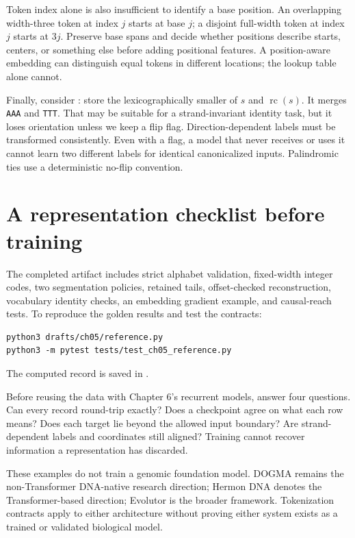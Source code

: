 Token index alone is also insufficient to identify a base position.
An overlapping width-three token at index $j$ starts at base $j$;
a disjoint full-width token at index $j$ starts at $3j$. Preserve base
spans and decide whether positions describe starts, centers, or something
else before adding positional features. A position-aware embedding can
distinguish equal tokens in different locations; the lookup table alone cannot.

Finally, consider : store the lexicographically
smaller of $s$ and $\operatorname{rc}(s)$. It merges \texttt{AAA} and
\texttt{TTT}. That may be suitable for a strand-invariant identity task,
but it loses orientation unless we keep a flip flag. Direction-dependent
labels must be transformed consistently. Even with a flag, a model that
never receives or uses it cannot learn two different labels for identical
canonicalized inputs. Palindromic ties use a deterministic no-flip convention.

\section{A representation checklist before training}

The completed artifact includes strict alphabet validation, fixed-width
integer codes, two segmentation policies, retained tails, offset-checked
reconstruction, vocabulary identity checks, an embedding gradient example,
and causal-reach tests. To reproduce the golden results and test the contracts:
\begin{Verbatim}[fontsize=\small]
python3 drafts/ch05/reference.py
python3 -m pytest tests/test_ch05_reference.py
\end{Verbatim}
The computed record is saved in .

Before reusing the data with Chapter 6's recurrent models, answer four
questions. Can every record round-trip exactly? Does a checkpoint agree
on what each row means? Does each target lie beyond the allowed input
boundary? Are strand-dependent labels and coordinates still aligned?
Training cannot recover information a representation has discarded.

These examples do not train a genomic foundation model. DOGMA remains the
non-Transformer DNA-native research direction; Hermon DNA denotes the
Transformer-based direction; Evolutor is the broader framework. Tokenization
contracts apply to either architecture without proving either system exists
as a trained or validated biological model.

